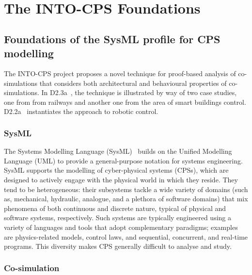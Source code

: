 \section{The INTO-CPS Foundations}\label{sec:foundations}



\subsection{Foundations of the SysML profile for CPS modelling}

The INTO-CPS project proposes a novel technique for proof-based analysis of co-simulations that considers both architectural and behavioural properties of co-simulations. In D2.3a~\cite{INTO-CPS-D2.3a-2017}, the technique is illustrated by way of two case studies, one from from railways and another one from the area of smart buildings control. D2.2a~\cite{INTO-CPS-D2.2a-2016} instantiates the approach to robotic control.

\subsubsection{SysML}

The Systems Modelling Language (SysML)~\cite{OMGSysML2012} builds on the Unified Modelling Language (UML) to provide a general-purpose notation for systems engineering. SysML supports the modelling of cyber-physical systems (CPSs), which are designed to actively engage with the physical world in which they reside. They tend to be heterogeneous: their subsystems tackle a wide variety of domains (such as, mechanical, hydraulic, analogue, and a plethora of software domains) that mix phenomena of both continuous and discrete nature, typical of physical and software systems, respectively. Such systems are typically engineered using a variety of languages and tools that adopt complementary paradigms; examples are physics-related models, control laws, and sequential, concurrent, and real-time programs. This diversity makes CPS generally difficult to analyse and study.

\subsubsection{Co-simulation}

